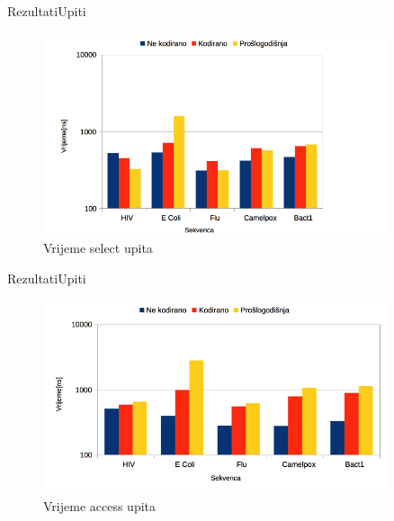 \documentclass{beamer}
\begin{document}
\begin{frame}{Rezultati}{Upiti}
\begin{figure}[H]
\centering
\includegraphics[width=0.9\textwidth]{chart/vrijeme_select.png}
\caption{Vrijeme select upita}
\end{figure}
\end{frame}

\begin{frame}{Rezultati}{Upiti}
\begin{figure}[H]
\centering
\includegraphics[width=0.9\textwidth]{chart/vrijeme_access.png}
\caption{Vrijeme access upita}
\end{figure}
\end{frame}
\end{document}
